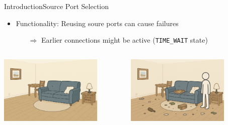 \documentclass[aspectratio=169, hyperref={colorlinks=true, allcolors=SecondaryColor}, c]{beamer}
\begin{document}
	\begin{frame}[fragile]{Introduction}{Source Port Selection}
		\begin{itemize}
			\item \alert{Functionality:} Reusing soure ports can cause failures
			\begin{itemize}
				\item[\alert{$\Rightarrow$}] Earlier connections might be active (\texttt{TIME\_WAIT} state)
			\end{itemize}
		\end{itemize}
		\begin{columns}
			\begin{column}[t]{0.33\textwidth}
				\vspace{2cm}

				\includegraphics[width=0.8\textwidth, center]{./figures/room_cleaned.png}
			\end{column}
			\begin{column}[t]{0.33\textwidth}
				\vspace{0cm}

				\includegraphics[width=0.8\textwidth, center]{./figures/room_not_cleaned.png}
			\end{column}
			\begin{column}[t]{0.33\textwidth}
				\vspace{0cm}


\end{column}
\end{columns}
\end{frame}
\end{document}
